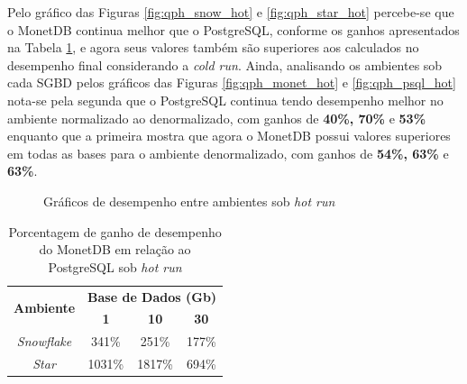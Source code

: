 Pelo gráfico das Figuras \ref{fig:qph_snow_hot} e \ref{fig:qph_star_hot} percebe-se que o MonetDB continua melhor que o PostgreSQL, conforme os ganhos apresentados na Tabela \ref{tab:ganho_monet_psql_hot}, e agora seus valores também são superiores aos calculados no desempenho final considerando a \textit{cold run}. Ainda, analisando os ambientes sob cada SGBD pelos gráficos das Figuras \ref{fig:qph_monet_hot} e \ref{fig:qph_psql_hot} nota-se pela segunda que o PostgreSQL continua tendo desempenho melhor no ambiente normalizado ao denormalizado, com ganhos de \textbf{40\%, 70\%} e \textbf{53\%} enquanto que a primeira mostra que agora o MonetDB possui valores superiores em todas as bases para o ambiente denormalizado, com ganhos de \textbf{54\%, 63\%} e \textbf{63\%}.

\begin{figure}[htpb]
        \centering
        \caption{Gráficos de desempenho entre ambientes sob \textit{hot run}}
        \label{fig:qph_model_hot}
\end{figure}

\begin{table}[htpb]
        \centering
        \caption{Porcentagem de ganho de desempenho do MonetDB em relação ao PostgreSQL sob \textit{hot run}}
        \label{tab:ganho_monet_psql_hot}
        \begin{tabular}{|c|c|c|c|}
        \hline
        \multirow{2}{*}{\textbf{Ambiente}} & \multicolumn{3}{c|}{\textbf{Base de Dados (Gb)}} \\ \cline{2-4} 
        & \textbf{1}     & \textbf{10}    & \textbf{30}    \\ \hline
        \textit{Snowflake}                 & 341\%          & 251\%          & 177\%          \\ \hline
        \textit{Star}                      & 1031\%         & 1817\%         & 694\%          \\ \hline
        \end{tabular}
\end{table}
    
